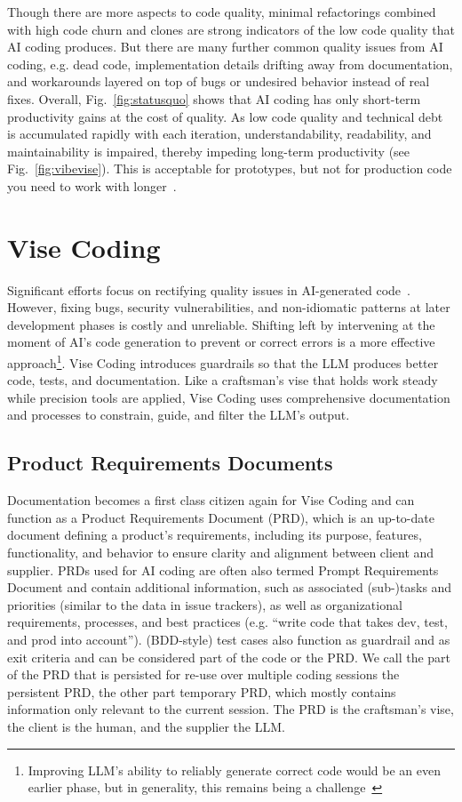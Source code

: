 \documentclass[twocolumn]{article}
\begin{document}
Though there are more aspects to code quality, minimal refactorings combined with high code churn and clones 
are strong indicators of the low code quality that AI coding produces.
But there are many further common quality issues from AI coding, e.g. dead code,
implementation details drifting away from documentation,
and workarounds layered on top of bugs or undesired behavior instead of real fixes. 
Overall, Fig.~\ref{fig:statusquo} shows that AI coding has only short-term productivity gains at the cost of quality.
As low code quality and technical debt is accumulated rapidly with each iteration, understandability, readability, and maintainability is impaired, thereby impeding long-term productivity (see Fig.~\ref{fig:vibevise}). This is acceptable for prototypes, but not for production code you need to work with longer~\cite{AO25}.

\section{Vise Coding}

Significant efforts focus on rectifying quality issues in AI-generated code~\cite{URL:payasyoucode,URL:pragmaticcoders,URL:SECVAIB}.
However, fixing bugs, security vulnerabilities, and non-idiomatic patterns at later development phases is costly and unreliable.
Shifting left by intervening at the moment of AI's code generation to prevent or correct errors is a more effective approach\footnote{Improving LLM's ability to reliably generate correct code would be an even earlier phase, but in generality, this remains being a challenge~\cite{KH25,JB25,PL25,MH25,PS25,RS25}}.
Vise Coding introduces guardrails so that the LLM produces better code, tests, and documentation. 
Like a craftsman's vise that holds work steady while precision tools are applied,
Vise Coding uses comprehensive documentation and processes to constrain, guide, and filter the LLM's output.

\subsection{Product Requirements Documents}

Documentation becomes a first class citizen again for Vise Coding and
can function as a Product Requirements Document (PRD),
which is an up-to-date document defining a product's requirements,
including its purpose, features, functionality, and behavior to ensure clarity and alignment between client and supplier. 
PRDs used for AI coding are often also termed Prompt Requirements Document and
contain additional information, such as associated (sub-)tasks and priorities (similar to the data in issue trackers),
as well as organizational requirements, processes, and best practices (e.g. ``write code that takes dev, test, and prod into account'').
(BDD-style) test cases also function as guardrail and as exit criteria
and can be considered part of the code or the PRD.
We call the part of the PRD that is persisted for re-use over multiple coding sessions the persistent PRD, 
the other part temporary PRD, which mostly contains information only relevant to the current session.
The PRD is the craftsman's vise, the client is the human, and the supplier the LLM.
\end{document}
